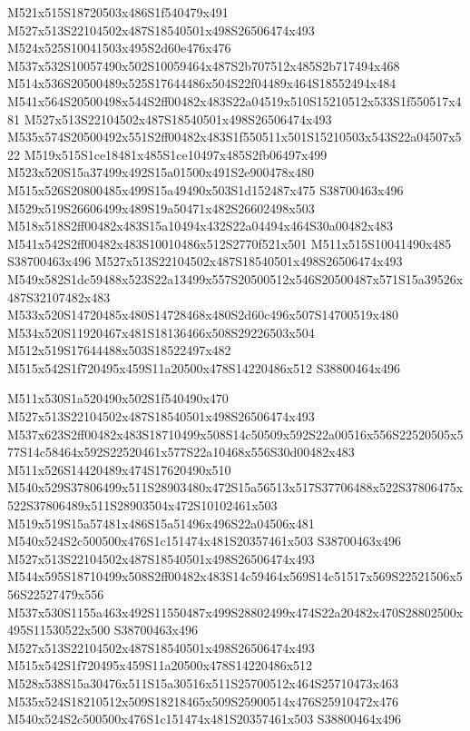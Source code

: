 \documentclass{article}
\begin{document}
\begin{multicols}{2}
M521x515S18720503x486S1f540479x491 M527x513S22104502x487S18540501x498S26506474x493 M524x525S10041503x495S2d60e476x476 M537x532S10057490x502S10059464x487S2b707512x485S2b717494x468 M514x536S20500489x525S17644486x504S22f04489x464S18552494x484 M541x564S20500498x544S2ff00482x483S22a04519x510S15210512x533S1f550517x481 M527x513S22104502x487S18540501x498S26506474x493 M535x574S20500492x551S2ff00482x483S1f550511x501S15210503x543S22a04507x522 M519x515S1ce18481x485S1ce10497x485S2fb06497x499 M523x520S15a37499x492S15a01500x491S2e900478x480 M515x526S20800485x499S15a49490x503S1d152487x475 S38700463x496 M529x519S26606499x489S19a50471x482S26602498x503 M518x518S2ff00482x483S15a10494x432S22a04494x464S30a00482x483 M541x542S2ff00482x483S10010486x512S2770f521x501 M511x515S10041490x485 S38700463x496 M527x513S22104502x487S18540501x498S26506474x493 M549x582S1dc59488x523S22a13499x557S20500512x546S20500487x571S15a39526x487S32107482x483 M533x520S14720485x480S14728468x480S2d60c496x507S14700519x480 M534x520S11920467x481S18136466x508S29226503x504 M512x519S17644488x503S18522497x482 M515x542S1f720495x459S11a20500x478S14220486x512 S38800464x496

M511x530S1a520490x502S1f540490x470 M527x513S22104502x487S18540501x498S26506474x493 M537x623S2ff00482x483S18710499x508S14c50509x592S22a00516x556S22520505x577S14c58464x592S22520461x577S22a10468x556S30d00482x483 M511x526S14420489x474S17620490x510 M540x529S37806499x511S28903480x472S15a56513x517S37706488x522S37806475x522S37806489x511S28903504x472S10102461x503 M519x519S15a57481x486S15a51496x496S22a04506x481 M540x524S2c500500x476S1c151474x481S20357461x503 S38700463x496 M527x513S22104502x487S18540501x498S26506474x493 M544x595S18710499x508S2ff00482x483S14c59464x569S14c51517x569S22521506x556S22527479x556 M537x530S1155a463x492S11550487x499S28802499x474S22a20482x470S28802500x495S11530522x500 S38700463x496 M527x513S22104502x487S18540501x498S26506474x493 M515x542S1f720495x459S11a20500x478S14220486x512 M528x538S15a30476x511S15a30516x511S25700512x464S25710473x463 M535x524S18210512x509S18218465x509S25900514x476S25910472x476 M540x524S2c500500x476S1c151474x481S20357461x503 S38800464x496


\end{multicols}
\end{document}
